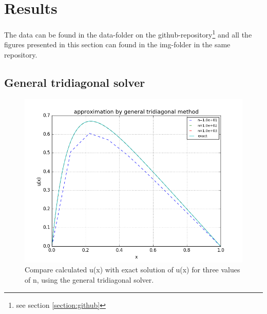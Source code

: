 \documentclass[11pt,a4paper,notitlepage]{article}
\begin{document}
\section{Results}
\label{section:results}
	The data can be found in the data-folder on the github-repository\footnote{see section \ref{section:github}} and all the figures presented in this section can found in the img-folder in the same repository. \\
	
\subsection{General tridiagonal solver}
	\begin{figure}[h!]
		\includegraphics[scale=0.7]{../img/compare_general_exact.png}
		\caption{Compare calculated u(x) with exact solution of u(x) for three values of n, using the general tridiagonal solver.}
		\label{fig:compare_gen_exact}
	\end{figure}
\end{document}
